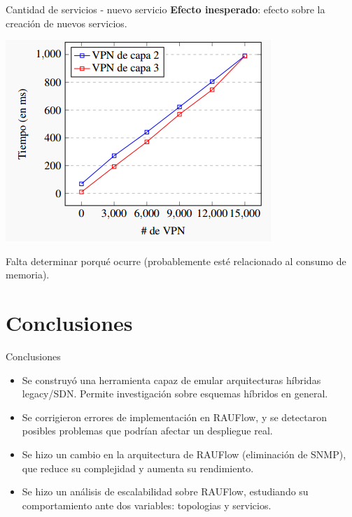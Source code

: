 \documentclass[xcolor=svgnames]{beamer}
\begin{document}
\begin{frame}{Cantidad de servicios - nuevo servicio}
	\textbf{Efecto inesperado}: efecto sobre la creación de nuevos servicios.
	\pause
	\begin{center}
		\includegraphics[scale=0.7]{cummulative_vpn}
	\end{center}
	\pause
	Falta determinar porqué ocurre (probablemente esté relacionado al consumo de memoria).
\end{frame}


\section{Conclusiones}

\begin{frame}{}
	\tableofcontents[currentsection]
\end{frame}

\begin{frame}{Conclusiones}
	\begin{itemize}
		\item Se construyó una herramienta capaz de emular arquitecturas híbridas legacy/SDN. Permite investigación sobre esquemas híbridos en general.
		\pause
		\item Se corrigieron errores de implementación en RAUFlow, y se detectaron posibles problemas que podrían afectar un despliegue real.
		\pause
		\item Se hizo un cambio en la arquitectura de RAUFlow (eliminación de SNMP), que reduce su complejidad y aumenta su rendimiento.
		\pause
		\item Se hizo un análisis de escalabilidad sobre RAUFlow, estudiando su comportamiento ante dos variables: topologias y servicios.
	\end{itemize}
\end{frame}
\end{document}
